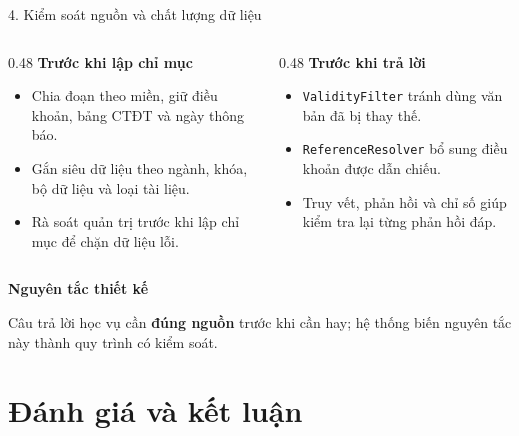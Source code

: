 \documentclass[t, aspectratio=169]{beamer}
\begin{document}
			\begin{frame}{4. Kiểm soát nguồn và chất lượng dữ liệu}
			\vspace{0.18cm}
			\begin{columns}[T,onlytextwidth]
				\begin{column}{0.48\textwidth}
					{\bfseries\color{hustprimary} Trước khi lập chỉ mục}
					\vspace{0.08cm}

					\small
					\begin{itemize}
						\setlength{\itemsep}{0.22cm}
						\item Chia đoạn theo miền, giữ điều khoản, bảng CTĐT và ngày thông báo.
						\item Gắn siêu dữ liệu theo ngành, khóa, bộ dữ liệu và loại tài liệu.
						\item Rà soát quản trị trước khi lập chỉ mục để chặn dữ liệu lỗi.
					\end{itemize}
				\end{column}
				\begin{column}{0.48\textwidth}
					{\bfseries\color{hustprimary} Trước khi trả lời}
					\vspace{0.08cm}

					\small
					\begin{itemize}
						\setlength{\itemsep}{0.22cm}
						\item \texttt{ValidityFilter} tránh dùng văn bản đã bị thay thế.
						\item \texttt{ReferenceResolver} bổ sung điều khoản được dẫn chiếu.
						\item Truy vết, phản hồi và chỉ số giúp kiểm tra lại từng phản hồi đáp.
					\end{itemize}
				\end{column}
			\end{columns}

			\vspace{0.28cm}
			{\bfseries\color{hustprimary} Nguyên tắc thiết kế}

				\vspace{0.04cm}
				\small Câu trả lời học vụ cần \textbf{đúng nguồn} trước khi cần hay; hệ thống biến nguyên tắc này thành quy trình có kiểm soát.
				\end{frame}

	\section{Đánh giá và kết luận}
\end{document}
